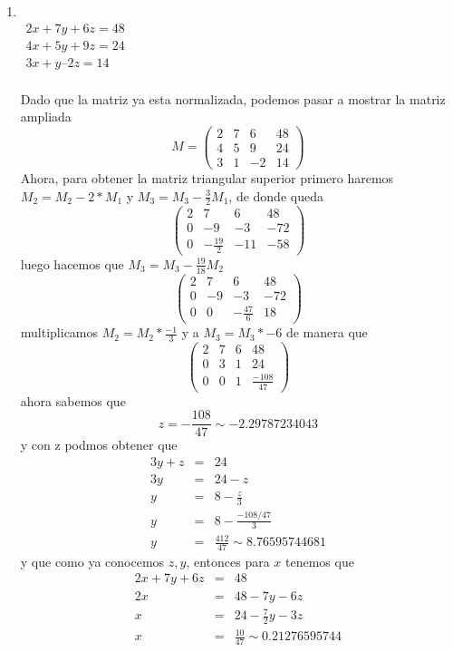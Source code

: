\documentclass[11pt]{article}
\begin{document}
\begin{multicols}{2}
	\begin{enumerate}[\bf{Sistema} 1]
		\item 
			\ \\$\begin{matrix}
				2x + 7y + 6z = 48 \\
				4x + 5y + 9z = 24 \\
				3x +  y – 2z = 14 \\
			\end{matrix}$
		
			Dado que la matriz ya esta normalizada, podemos pasar a mostrar la matriz ampliada
				$$M = \left(\begin{array}{rrrr}
						2 & 7 & 6 & 48 \\
						4 & 5 & 9 & 24 \\
						3 & 1 & -2 & 14
					\end{array}\right)$$
			Ahora, para obtener la matriz triangular superior primero haremos $M_2 = M_2 - 2*M_1$ y $M_3 = M_3 - \frac{3}{2}M_1$, de donde queda 
				$$\left(\begin{array}{rrrr}
						2 & 7 & 6 & 48 \\
						0 & -9 & -3 & -72 \\
						0 & -\frac{19}{2} & -11 & -58
					\end{array}\right)$$
			luego hacemos que $M_3 = M_3 - \frac{19}{18} M_2$
				$$\left(\begin{array}{rrrr}
						2 & 7 & 6 & 48 \\
						0 & -9 & -3 & -72 \\
						0 & 0 & -\frac{47}{6} & 18
					\end{array}\right)$$
			multiplicamos $M_2 = M_2* \frac{-1}{3}$ y a $M_3 = M_3*-6$ de manera que
				$$\left(\begin{array}{rrrr}
					2 & 7 & 6 & 48 \\
					0 & 3 & 1 & 24 \\
					0 & 0 & 1 & \frac{-108}{47}
				\end{array}\right)$$
			ahora sabemos que $$z = -\frac{108}{47} \sim -2.29787234043$$ y con z  podmos obtener que
				\begin{eqnarray*}
					3y + z &=& 24 \\
					3y &=& 24 - z \\
					y &=& 8- \frac{z}{3} \\
					y &=& 8 - \frac{-108/47}{3} \\
					y &=& \frac{412}{47} \sim 8.76595744681
				\end{eqnarray*}
			y que como ya conocemos $z,y$, entonces para $x$ tenemos que
				\begin{eqnarray*}
					2x + 7y + 6z &=& 48 \\
					2x &=& 48 - 7y - 6z \\
					x  &=& 24 - \frac{7}{2}y - 3z \\
					x  &=& \frac{10}{47} \sim 0.21276595744
				\end{eqnarray*}


\end{enumerate}
\end{multicols}
\end{document}
